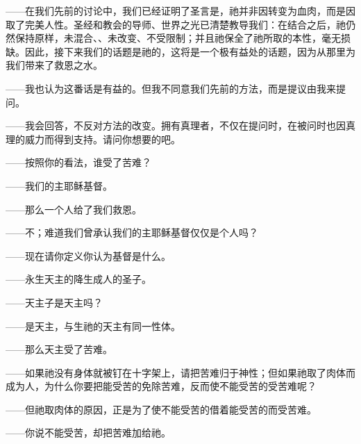 \par

——在我们先前的讨论中，我们已经证明了圣言是，祂并非因转变为血肉，而是因取了完美人性。圣经和教会的导师、世界之光已清楚教导我们：在结合之后，祂仍然保持原样，未混合、、未改变、不受限制；并且祂保全了祂所取的本性，毫无损缺。因此，接下来我们的话题是祂的，这将是一个极有益处的话题，因为从那里为我们带来了救恩之水。\par

——我也认为这番话是有益的。但我不同意我们先前的方法，而是提议由我来提问。\par

——我会回答，不反对方法的改变。拥有真理者，不仅在提问时，在被问时也因真理的威力而得到支持。请问你想要的吧。\par

——按照你的看法，谁受了苦难？\par

——我们的主耶稣基督。\par

——那么一个人给了我们救恩。\par

——不；难道我们曾承认我们的主耶稣基督仅仅是个人吗？\par

——现在请你定义你认为基督是什么。\par

——永生天主的降生成人的圣子。\par

——天主子是天主吗？\par

——是天主，与生祂的天主有同一性体。\par

——那么天主受了苦难。\par

——如果祂没有身体就被钉在十字架上，请把苦难归于神性；但如果祂取了肉体而成为人，为什么你要把能受苦的免除苦难，反而使不能受苦的受苦难呢？\par

——但祂取肉体的原因，正是为了使不能受苦的借着能受苦的而受苦难。\par

——你说不能受苦，却把苦难加给祂。\par

